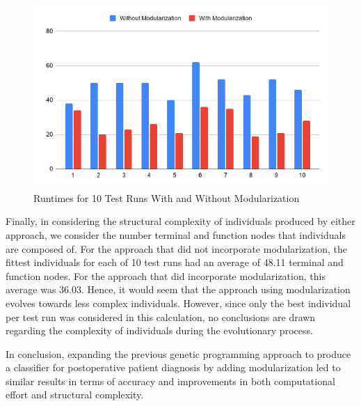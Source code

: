 \begin{figure}[H]
\centering
\includegraphics[width=\textwidth]{report/08_discussion/runtimes.png}
\caption{Runtimes for 10 Test Runs With and Without Modularization}
\label{fig:runtimes}
\end{figure}

Finally, in considering the structural complexity of individuals produced by either approach, we consider the number terminal and function nodes that individuals are composed of. For the approach that did not incorporate modularization, the fittest individuals for each of 10 test runs had an average of 48.11 terminal and function nodes. For the approach that did incorporate modularization, this average was 36.03. Hence, it would seem that the approach using modularization evolves towards less complex individuals. However, since only the best individual per test run was considered in this calculation, no conclusions are drawn regarding the complexity of individuals during the evolutionary process.

In conclusion, expanding the previous genetic programming approach to produce a classifier for postoperative patient diagnosis by adding modularization led to similar results in terms of accuracy and improvements in both computational effort and structural complexity.
